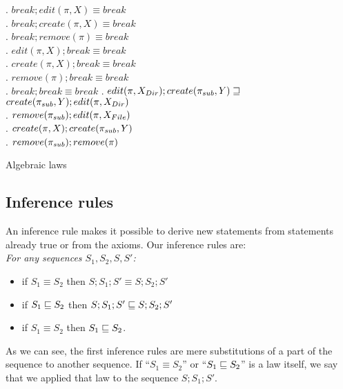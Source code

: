 \begin{table}[H]
\begin{table}[thb]
{{{\begin{minipage}{7.2cm}
\lawxxix. \(break; edit(\pi,X) \equiv break\)\\
\lawxxx. \(break; create(\pi,X) \equiv break\)\\
\lawxxxi. \(break; remove(\pi) \equiv break\)\\
\lawxxxii. \(edit(\pi,X); break \equiv break\)\\
\lawxxxiii. \(create(\pi,X); break \equiv break\)\\
\lawxxxiv. \(remove(\pi); break \equiv break\)\\
\lawxxxv. \(break; break \equiv break\)
\lawiibp. \(edit(\pi,X_{Dir}); create(\pi_{sub},Y)\sqsupseteq\)\\\indent\(%
create(\pisub,Y); edit(\pi,\cdir{X})\)\\
\lawiiic. \(remove(\pi_{sub}); edit(\pi,X_{File})\)\\
\lawxxxvi. \(create(\pi,X); create(\pi_{sub},Y)\)\\
\lawxxxvii. \(remove(\pi_{sub}); remove(\pi)\)
\end{minipage}
}}
}
\caption{Algebraic laws}
\end{table}

\subsection{Inference rules}

An inference rule makes it possible to derive new statements from 
statements already true or from the axioms. 
Our inference rules are:\\
\emph{For any sequences \(S_1, S_2, S, S'\):}
\begin{itemize}
\item if \(S_1\equiv S_2\) then \(S;S_1;S'\equiv S;S_2;S'\)
\item if \(S_1\sqsubseteq S_2\) then \(S;S_1;S'\sqsubseteq S;S_2;S'\)
\item if \(S_1\equiv S_2\) then \(S_1\sqsubseteq S_2\).
\end{itemize}
As we can see, the first inference rules are mere substitutions of a part
of the sequence to another sequence. 
If ``\(S_1\equiv S_2\)'' or 
``\(S_1\sqsubseteq S_2\)'' is a law itself, we say that we applied that law to
the sequence \(S;S_1;S'\).


\end{table}
